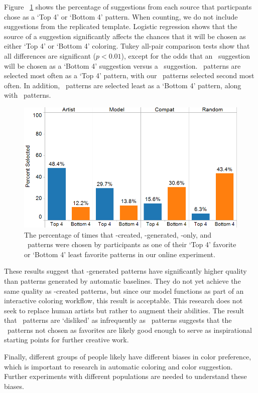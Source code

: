 Figure ~\ref{fig:study} shows the percentage of suggestions from each source that particpants chose as a `Top 4' or `Bottom 4' pattern. When counting, we do not include suggestions from the replicated template. Logistic regression shows that the source of a suggestion significantly affects the chances that it will be chosen as either `Top 4' or `Bottom 4' coloring. Tukey all-pair comparison tests show that all differences are significant ($p < 0.01$), except for the odds that an \artistSource~suggestion will be chosen as a `Bottom 4' suggestion versus a \modelSource~suggestion. \artistSource~patterns are selected most often as a `Top 4' pattern, with our \modelSource~patterns selected second most often. In addition, \modelSource~patterns are selected least as a `Bottom 4' pattern, along with \artistSource~patterns.

\begin{figure}[h!]
  \begin{center}
  \includegraphics[width=\columnwidth]{figs/evaluation.png}
	\end{center}
\caption{The percentage of times that \artistSource-created, \modelSource-generated, \compatSource-only, and \randomSource~patterns were chosen by participants as one of their `Top 4' favorite or `Bottom 4' least favorite patterns in our online experiment.}

 \label{fig:study}
\end{figure}

These results suggest that \modelSource-generated patterns have significantly higher quality than patterns generated by automatic baselines. They do not yet achieve the same quality as \artistSource-created patterns, but since our model functions as part of an interactive coloring workflow, this result is acceptable. This research does not seek to replace human artists but rather to augment their abilities. The result that \modelSource~patterns are `disliked' as infrequently as \artistSource~patterns suggests that the \modelSource~patterns not chosen as favorites are likely good enough to serve as inspirational starting points for further creative work.

Finally, different groups of people likely have different biases in color preference, which is important to research in automatic coloring and color suggestion. Further experiments with different populations are needed to understand these biases.
